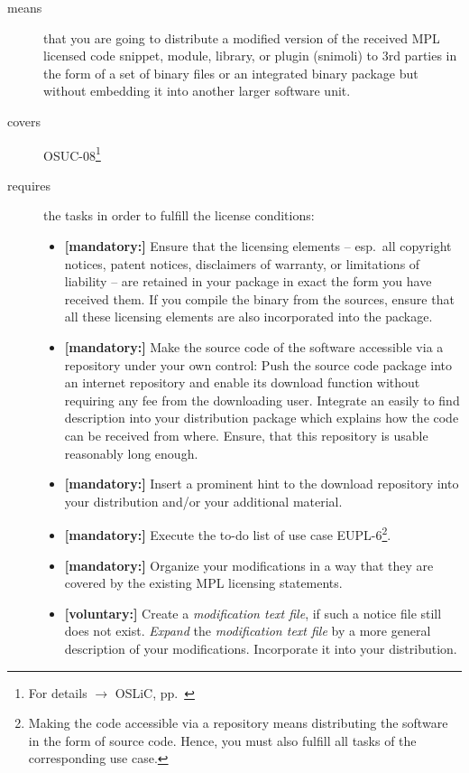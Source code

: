 \begin{description}
\item[means] that you are going to distribute a modified version of the received
MPL licensed code snippet, module, library, or plugin (snimoli) to 3rd
parties in the form of a set of binary files or an integrated binary package but
without embedding it into another larger software unit.
\item[covers] OSUC-08\footnote{For details $\rightarrow$ OSLiC, pp.\ \pageref{OSUC-08-DEF}}
\item[requires] the tasks in order to fulfill the license conditions:
\begin{itemize}

  \item \textbf{[mandatory:]} Ensure that the licensing elements -- esp.\ all
  copyright notices, patent notices, disclaimers of warranty, or limitations of
  liability -- are retained in your package in exact the form you have received
  them. If you compile the binary from the sources, ensure that all these
  licensing elements are also incorporated into the package.

  \item \textbf{[mandatory:]} Make the source code of the software accessible
  via a repository under your own control: Push the source code package into an
  internet repository and enable its download function without requiring any fee
  from the downloading user. Integrate an easily to find description into your
  distribution package which explains how the code can be received from where.
  Ensure, that this repository is usable reasonably long enough.
  
  \item \textbf{[mandatory:]} Insert a prominent hint to the download repository
  into your distribution and/or your additional material.

  \item \textbf{[mandatory:]} Execute the to-do list of use case EUPL-6\footnote{
  Making the code accessible via a repository means distributing the software in
  the form of source code. Hence, you must also fulfill all tasks of the
  corresponding use case.}.
  
  \item \textbf{[mandatory:]} Organize your modifications in a way that they are
  covered by the existing MPL licensing statements.
  
  \item \textbf{[voluntary:]} Create a \emph{modification text file}, if such a
  notice file still does not exist. \emph{Expand} the \emph{modification text
  file} by a more general description of your modifications. Incorporate it into
  your distribution.
  

\end{itemize}
\end{description}
